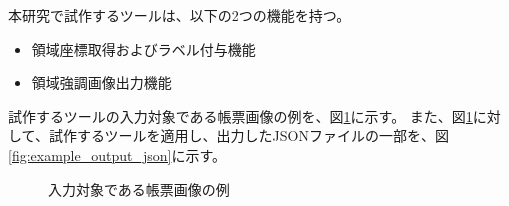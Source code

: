 本研究で試作するツールは、以下の2つの機能を持つ。

\begin{itemize}
    \item 領域座標取得およびラベル付与機能
    \item 領域強調画像出力機能
\end{itemize}

試作するツールの入力対象である帳票画像の例を、図\ref{fig:original}に示す。
また、図\ref{fig:original}に対して、試作するツールを適用し、出力したJSONファイルの一部を、図\ref{fig:example_output_json}に示す。

\begin{figure}[tp]
    \begin{center}
        \caption{入力対象である帳票画像の例}
        \label{fig:original}
    \end{center}
\end{figure}

